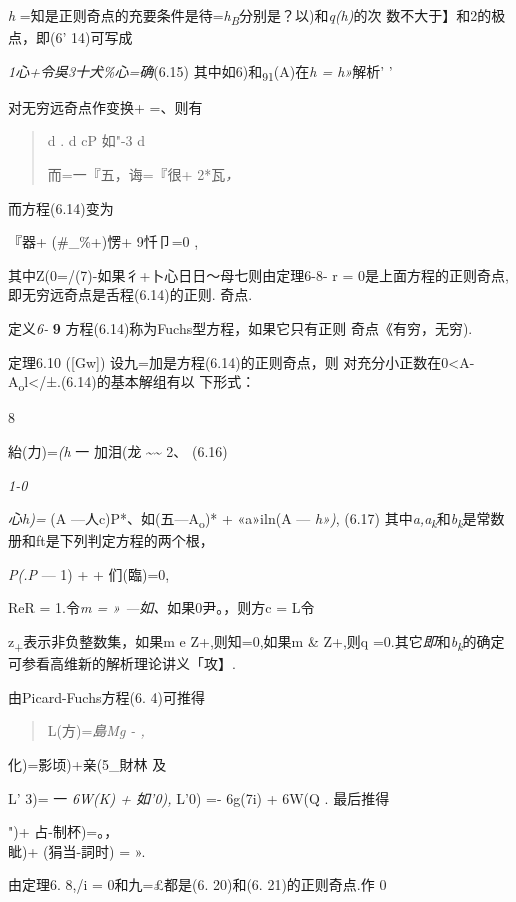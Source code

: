 \documentclass{article}
\begin{document}
\emph{h}
=知是正则奇点的充要条件是待=\emph{h\textsubscript{B}}分别是？以)和\emph{q(h)}的次
数不大于】和2的极点，即(6' 14)可写成

\emph{1心+令吳3十犬\%心=确}(6.15)
其中如6)和\textsubscript{91}(A)在\emph{h = h»}解析' '

对无穷远奇点作变换+ =、则有

\begin{quote}
d . d cP 如"-3 d

而=一『五，诲=『很+ 2*瓦\emph{，}
\end{quote}

而方程(6.14)变为

『器+ (\#\_\%+)愣+ 9忏卩=0 ,

其中Z(0=/(7)-如果彳+卜心日日〜母七则由定理6-8- r =
0是上面方程的正则奇点,即无穷远奇点是舌程(6.14)的正则. 奇点.

定义\emph{6-} \textbf{9} 方程(6.14)称为Fuchs型方程，如果它只有正则
奇点《有穷，无穷).

定理6.10 ({[}Gw{]}) 设九=加是方程(6.14)的正则奇点，则
对充分小正数在0\textless{}\textbar{}A-A\textsubscript{o}l\textless{}/±.(6.14)的基本解组有以
下形式：

8

紿(力)=\emph{(h} 一 加泪(龙 \textasciitilde{}\textasciitilde{} 2、
(6.16)

\emph{1-0}

\emph{心h)=} (A ---人c)P*、如(五---A\textsubscript{o})* + «a»iln(A ---
\emph{h»)}, (6.17)
其中\emph{a,a\textsubscript{k}}和\emph{b\textsubscript{k}}是常数册和ft是下列判定方程的两个根，

\emph{P(.P} --- 1) + + 们(臨)=0,

ReR = 1.令\emph{m = » ---如、}如果0尹。，则方c = L令

z\textsubscript{+}表示非负整数集，如果m e Z+,则知=0,如果m \& Z+,则q
=0.其它\emph{即}和\emph{b\textsubscript{k}}的确定可参看高维新的解析理论讲义「攻】.

由Picard-Fuchs方程(6. 4)可推得

\begin{quote}
L(方)=\emph{島Mg - ,}
\end{quote}

化)=影顷)+亲(5\_財林 及

L' 3)= 一 \emph{6W(K) + 如'0),} L'0) =- 6g(7i) + 6W(Q . 最后推得

")+ \textbar{}占-制杯)=。，\\
眦)+ (狷当-詞时) = ».

由定理6. 8,/i = 0和九=£都是(6. 20)和(6. 21)的正则奇点.作 0
\end{document}
